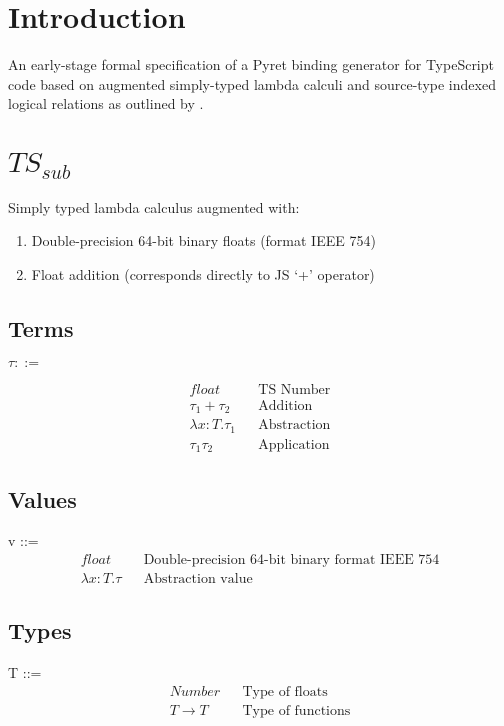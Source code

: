 \documentclass{article}
\begin{document}
	
	\tableofcontents
	\pagebreak
	
	\section{Introduction}
	An early-stage formal specification of a Pyret binding generator for TypeScript code based on augmented simply-typed lambda calculi and source-type indexed logical relations as outlined by \textcite{FFI}.
	
	\section{$TS_{sub}$}
	
	Simply typed lambda calculus augmented with:
	\begin{enumerate}
		\item Double-precision 64-bit binary floats (format IEEE 754)
		\item Float addition (corresponds directly to JS `+' operator)
	\end{enumerate}
	
	\subsection{Terms}
	$\tau ::=$
	
	\begin{align*}
		float  										&& \text{TS Number} \\
		\tau_1 + \tau_2 							&& \text{Addition} \\
		\lambda x:T.\tau_1							&& \text{Abstraction} \\
		\tau_1 \tau_2								&& \text{Application}
	\end{align*}


	\subsection{Values}
	v ::=
	\begin{align*}
		float										&& \text{Double-precision 64-bit binary format IEEE 754} \\
		\lambda x:T.\tau							&& \text{Abstraction value}
	\end{align*}
	
	
	\subsection{Types}
	T ::=
	\begin{align*}
		Number												&& \text{Type of floats}\\
		T \rightarrow T										&& \text{Type of functions}
	\end{align*}
	
\end{document}
